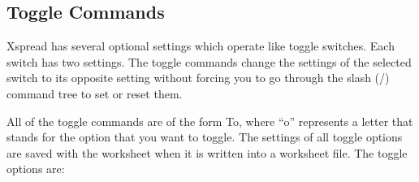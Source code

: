\subsection*{Toggle Commands}

    Xspread has several optional settings which operate like toggle switches.  
Each switch has two settings.  The toggle commands change the settings of the 
selected switch to its opposite setting without forcing you to go through the 
slash (/) command tree to set or reset them.

    All of the toggle commands are of the form \ctrl To, where ``o'' 
represents a
letter that stands for the option that you want to toggle.  The settings of 
all toggle options are saved with the worksheet when it is written into a 
worksheet file.  The toggle options are:


